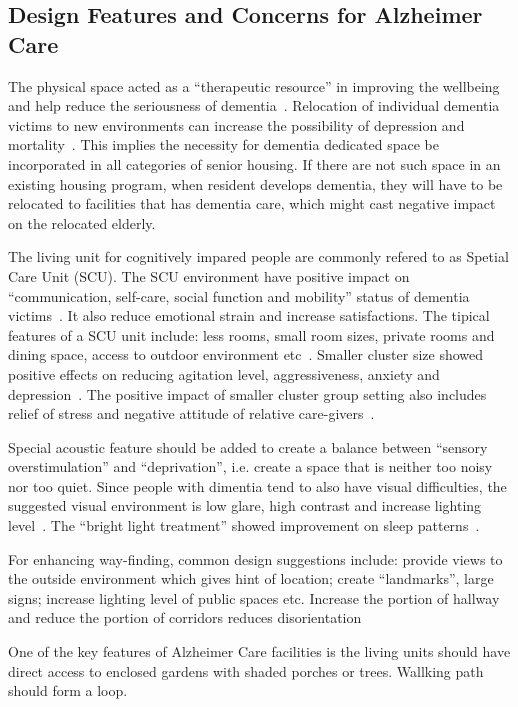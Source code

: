 \subsection{Design Features and Concerns for Alzheimer Care}
The physical space acted as a ``therapeutic resource'' in improving
the wellbeing and help reduce the seriousness of
dementia~\cite{Day2000}. Relocation of individual dementia victims to
new environments can increase the possibility of depression and
mortality~\cite{ANTHONY01111987}. This implies the necessity for
dementia dedicated space be incorporated in all categories of senior
housing. If there are not such space in an existing housing program,
when resident develops dementia, they will have to be relocated to
facilities that has dementia care, which might cast negative impact on
the relocated elderly. 

The living unit for cognitively impared people are commonly refered to
as Spetial Care Unit (SCU). The SCU environment have positive impact
on ``communication, self-care, social function and mobility'' status
of dementia victims~\cite{Day2000}. It also reduce emotional strain
and increase satisfactions. The tipical features of a SCU unit
include: less rooms, small room sizes, private rooms and dining space,
access to outdoor environment etc~\cite{Day2000}. Smaller cluster size
showed positive effects on reducing agitation level, aggressiveness,
anxiety and depression~\cite{Day2000}. The positive impact of smaller
cluster group setting also includes relief of stress and negative
attitude of relative care-givers~\cite{Annerstedt19931529, Day2000}.

Special acoustic feature should be added to create a balance between
``sensory overstimulation'' and ``deprivation'', i.e. create a space
that is neither too noisy nor too quiet. Since people with dimentia
tend to also have visual difficulties, the suggested visual
environment is low glare, high contrast and increase lighting
level~\cite{Day2000}. The ``bright light treatment'' showed
improvement on sleep patterns~\cite{Mishima1994}.

For enhancing way-finding, common design suggestions include: provide
views to the outside environment which gives hint of location; create
``landmarks'', large signs; increase lighting level of public spaces
etc. Increase the portion of hallway and reduce the portion of
corridors reduces disorientation~\cite{Day2000}

One of the key features of Alzheimer Care facilities is the living
units should have direct access to enclosed gardens with shaded
porches or trees. Wallking path should form a loop.

